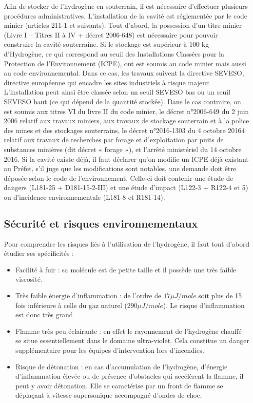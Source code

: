 \documentclass[11pt,french,a4paper]{article}
\begin{document}
Afin de stocker de l’hydrogène en souterrain, il est nécessaire d’effectuer plusieurs procédures administratives. L’installation de la cavité est réglementée par le code minier (articles 211-1 et suivants).
Tout d’abord, la possession d’un titre minier (Livre I – Titres II à IV + décret 2006-648) est nécessaire pour pouvoir construire la cavité souterraine. Si le stockage est supérieur à 100 kg d’Hydrogène, ce qui correspond au seuil des Installations Classées pour la Protection de l’Environnement (ICPE), ont est soumis au code minier mais aussi au code environnemental. Dans ce cas, les travaux suivent la directive SEVESO, directive européenne qui encadre les sites industriels à risque majeur. 
L’installation peut ainsi être classée selon un seuil SEVESO bas ou un seuil SEVESO haut (ce qui dépend de la quantité stockée). Dans le cas contraire, on est soumis aux titres VI du livre II du code minier, le décret n°2006-649 du 2 juin 2006 relatif aux travaux miniers, aux travaux de stockage souterrain et à la police des mines et des stockages souterrains, le décret n°2016-1303 du 4 octobre 20164 relatif aux travaux de recherches par forage et d’exploitation par puits de substances minières (dit décret « forage »), et l’arrêté ministériel du 14 octobre 2016. Si la cavité existe déjà, il faut déclarer qu’on modifie un ICPE déjà existant au Préfet, s’il juge que les modifications sont notables, une demande doit être déposée selon le code de l’environnement. Celle-ci doit contenir une étude de dangers (L181-25 + D181-15-2-III) et une étude d’impact (L122-3 + R122-4 et 5) ou d’incidence environnementale (L181-8 et R181-14).


\subsection{Sécurité et risques environnementaux}

Pour comprendre les risques liés à l'utilisation de l'hydrogène, il faut tout d'abord étudier ses spécificités :
\begin{itemize}
\item Facilité à fuir : sa molécule est de petite taille et il possède une très faible viscosité.
\item Très faible énergie d'inflammation : de l'ordre de $17 \mu J/mole$ soit plus de 15 fois inférieure à celle du gaz naturel ($290 \mu J/mole$). Le risque d'inflammation est donc très grand
\item Flamme très peu éclairante : en effet le rayonnement de l'hydrogène chauffé se situe essentiellement dans le domaine ultra-violet. Cela constitue un danger supplémentaire pour les équipes d'intervention lors d'incendies.
\item Risque de détonation : en cas d'accumulation de l'hydrogène, d'énergie d'inflammation élevée ou de présence d'obstacles qui accélèrent la flamme, il peut y avoir détonation. Elle se caractérise par un front de flamme se déplaçant à vitesse supersonique accompagné d'ondes de choc.
\end{itemize}
\end{document}
